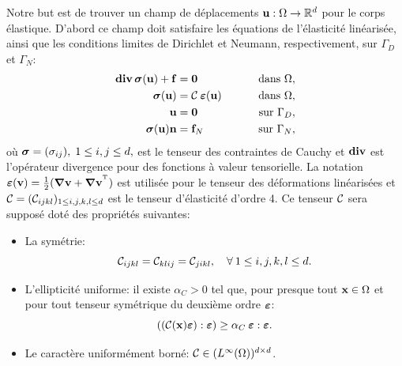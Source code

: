 \documentclass[11pt]{book}
\def\u{{\bf u}}
\def\n{{\bf n}}
\def\f{{\bf f}}
\def\vv{{\bf v}}
\def\x{{\bf x}}
\def\0{{\bf 0}}
\newcommand{\caC}{{\cal C}}
\newcommand{\R}{\mathbb{R}}
\newcommand{\bnabla}{\mbox{\boldmath{$\nabla$}}}
\newcommand{\bs}{\mbox{\boldmath{$\sigma$}}}
\newcommand{\e}{\mbox{\boldmath{$\varepsilon$}}}
\begin{document}
Notre but est de trouver un champ de déplacements $\u: \Omega \rightarrow \R^d$ pour le corps élastique. D'abord ce champ doit satisfaire les équations de l'élasticité linéarisée, ainsi que les conditions limites de Dirichlet et Neumann, respectivement, sur $\Gamma_D$ et $\Gamma_N$:
\begin{align} 
\label{eqelas}
\begin{aligned}
{\bf div}\, \bs(\u)  + \f &= \0   &\qquad \hbox{ dans } \Omega, \\ %
\bs(\u)&= \caC \: \e (\u)  &\qquad \hbox{ dans } \Omega, \\ 
\u &= \0  &\qquad \hbox{ sur } \Gamma_{D}, \\
\bs(\u)  \n  &= \f_N &\qquad  \hbox{ sur } \Gamma_N,
\end{aligned}
\end{align}
où $\bs = (\sigma_{ij}), \;1\le i,j \le d,$ est le tenseur des contraintes de Cauchy et ${\bf div}$ est l'opérateur divergence pour des fonctions à valeur tensorielle. 
La notation $\e(\vv) = \frac12 (\bnabla \vv + \bnabla \vv^{^\mathrm{T}})$ est utilisée pour le tenseur des déformations linéarisées
et $ \caC = (\caC_{ijkl})_{1\leq i,j,k,l \leq d}$ est le tenseur d'élasticité d'ordre 4. 
Ce tenseur $\caC$ sera supposé doté des propriétés suivantes:
\begin{itemize}
\item La symétrie:
$${\caC}_{ijkl} = {\caC}_{klij} = {\caC}_{jikl}, \quad \forall \: 1\leq i,j,k,l \leq d.$$
 
\item L'ellipticité uniforme: il existe $\alpha_C > 0$ tel que, pour presque tout $\x \in \Omega$ et pour tout tenseur symétrique du deuxième ordre $\e$:
$$ \left ( ({\caC} (\x) \e) : \e \right ) \geq \alpha_C \: \e:\e.$$
 
\item Le caractère uniformément borné: ${\caC} \in ( L^{\infty} (\Omega) )^{d \times d}$.
\end{itemize}
\end{document}

